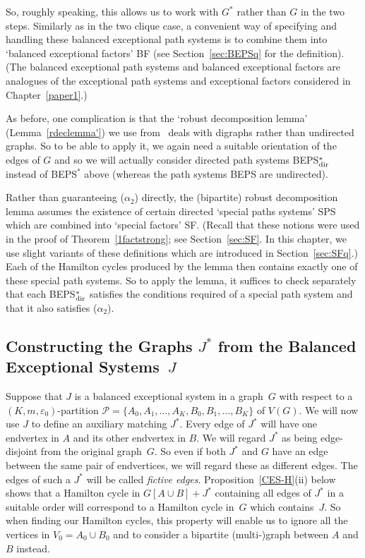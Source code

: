 \documentclass{memo-l}
\def\COMMENT#1{}
\def\cP{\mathcal{P}}
\def\eps{\varepsilon}
\numberwithin{section}{chapter}
\numberwithin{equation}{section}
\numberwithin{firstthm}{section}
\numberwithin{figure}{section}
\begin{document}
{So, roughly speaking, this allows us to work with 
$G^*$ rather than $G$ in the two steps. Similarly as in the two clique case,
a convenient way of specifying and handling these balanced exceptional path systems is to combine them into `balanced exceptional factors' BF
(see Section~\ref{sec:BEPSq} for the definition). (The balanced exceptional path systems and balanced exceptional factors are analogues of 
the exceptional path systems and exceptional factors considered in Chapter~\ref{paper1}.)

As before, one complication is that the `robust decomposition lemma' (Lem\-ma~\ref{rdeclemma'}) we use from~\cite{Kelly}
deals with digraphs rather than undirected graphs. 
So to be able to apply it, we again need a suitable orientation of  the edges of $G$ and so we will actually consider directed path systems
BEPS$^*_{\rm dir}$ instead of BEPS$^*$ above (whereas the path systems BEPS are undirected).

Rather than guaranteeing ($\alpha_2$) directly, the (bipartite) robust decomposition lemma
 assumes the existence of certain directed `special paths systems' SPS which are combined into `special factors' SF.
(Recall that these notions were used in the proof of Theorem~\ref{1factstrong}; see Section~\ref{sec:SF}. In this chapter, we use slight variants of these definitions which
are introduced in Section~\ref{sec:SFq}.)
Each of the Hamilton cycles produced by the lemma then contains exactly one of these special path systems.
So to apply the lemma, it suffices to check separately that each BEPS$^*_{\rm dir}$ satisfies the conditions required of a special path system 
and that it also satisfies ($\alpha_2$).%
\COMMENT{Andy: changed title of section 6.1}



\subsection{Constructing the Graphs $J^*$ from the Balanced Exceptional Systems~$J$} \label{BESstar}

Suppose that $J$ is a balanced exceptional system in a graph~$G$ with respect to a $(K,m,\eps_0)$-partition
$\cP=\{A_0,A_1,\dots,A_K,B_0,B_1,\dots,B_K\}$ of $V(G)$. We will now use $J$ to define an auxiliary matching $J^*$.
Every edge of $J^*$ will have one endvertex in $A$ and its other endvertex in $B$.
We will regard $J^*$ as being edge-disjoint from the original graph~$G$. So 
even if both $J^*$ and $G$ have an edge between the same pair of endvertices, we will regard these as different edges.
The edges of such a $J^*$ will be called \emph{fictive edges}. Proposition~\ref{CES-H}(ii) below shows that a Hamilton cycle in $G[A\cup B]+ J^*$ containing
all edges of $J^*$ in a suitable order will correspond to a Hamilton cycle in~$G$ which contains~$J$.
So when finding our Hamilton cycles, this property will enable us to ignore all the vertices in $V_0=A_0\cup B_0$ and to consider
a bipartite (multi-)graph between $A$ and $B$ instead.

}
\end{document}
